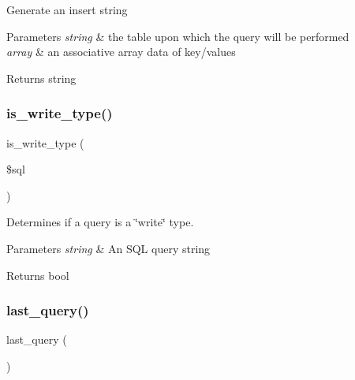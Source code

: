 Generate an insert string


\begin{DoxyParams}{Parameters}
{\em string} & the table upon which the query will be performed \\
\hline
{\em array} & an associative array data of key/values \\
\hline
\end{DoxyParams}
\begin{DoxyReturn}{Returns}
string 
\end{DoxyReturn}
\mbox{\label{class_c_i___d_b__driver_af435df5703c238769d6d16fde6d51182}} 
\subsubsection{\texorpdfstring{is\+\_\+write\+\_\+type()}{is\_write\_type()}}
{\footnotesize\ttfamily is\+\_\+write\+\_\+type (\begin{DoxyParamCaption}\item[{}]{\$sql }\end{DoxyParamCaption})}

Determines if a query is a \char`\"{}write\char`\"{} type.


\begin{DoxyParams}{Parameters}
{\em string} & An S\+QL query string \\
\hline
\end{DoxyParams}
\begin{DoxyReturn}{Returns}
bool 
\end{DoxyReturn}
\mbox{\label{class_c_i___d_b__driver_a8117354f1fa0b2873f0ad2792dc21389}} 
\subsubsection{\texorpdfstring{last\+\_\+query()}{last\_query()}}
{\footnotesize\ttfamily last\+\_\+query (\begin{DoxyParamCaption}{ }\end{DoxyParamCaption})}

